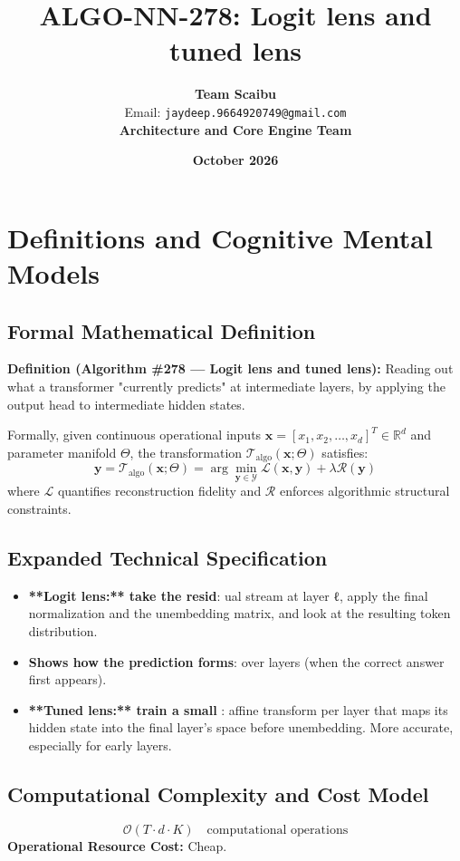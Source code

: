 \documentclass[11pt,a4paper]{article}
\title{\textbf{ALGO-NN-278: Logit lens and tuned lens}}
\author{\textbf{Team Scaibu} \\ \small Email: \texttt{jaydeep.9664920749@gmail.com} \\ \small \textbf{Architecture and Core Engine Team}}
\date{\textbf{October 2026}}
\theoremstyle{definition}
\begin{document}
\maketitle

\section{Definitions and Cognitive Mental Models}

\subsection{Formal Mathematical Definition}
\textbf{Definition (Algorithm \#278 --- Logit lens and tuned lens):}
Reading out what a transformer "currently predicts" at intermediate layers, by applying the output head to intermediate hidden states.

Formally, given continuous operational inputs $\mathbf{x} = [x_1, x_2, \dots, x_d]^T \in \mathbb{R}^d$ and parameter manifold $\Theta$, the transformation $\mathcal{T}_{\text{algo}}(\mathbf{x}; \Theta)$ satisfies:
{\boldmath
\begin{equation}
\mathbf{y} = \mathcal{T}_{\text{algo}}(\mathbf{x}; \Theta) = \arg\min_{\mathbf{y} \in \mathcal{Y}} \mathcal{L}(\mathbf{x}, \mathbf{y}) + \lambda \mathcal{R}(\mathbf{y})
\end{equation}
}
where $\mathcal{L}$ quantifies reconstruction fidelity and $\mathcal{R}$ enforces algorithmic structural constraints.

\subsection{Expanded Technical Specification}
\begin{itemize}
\item \textbf{**Logit lens:** take the resid}: ual stream at layer ℓ, apply the final normalization and the unembedding matrix, and look at the resulting token distribution.
\item \textbf{Shows how the prediction forms}:  over layers (when the correct answer first appears).
\item \textbf{**Tuned lens:** train a small }: affine transform per layer that maps its hidden state into the final layer's space before unembedding. More accurate, especially for early layers.
\end{itemize}

\subsection{Computational Complexity and Cost Model}
\begin{equation}
\mathcal{O}(T \cdot d \cdot K) \quad \text{computational operations}
\end{equation}
\textbf{Operational Resource Cost:} Cheap.
\end{document}
